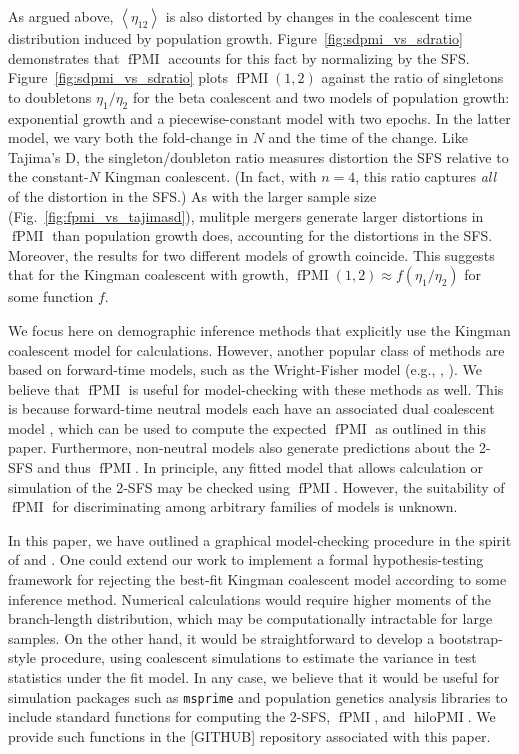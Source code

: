 \documentclass[11pt, letterpaper]{article}   	%
\newcommand{\fig}[1]{Fig.~\ref{#1}}
\newcommand{\Fig}[1]{Figure~\ref{#1}}
\newcommand{\E}[1]{\left< #1 \right>}
\DeclareMathOperator{\fpmi}{fPMI}
\DeclareMathOperator{\hilopmi}{hiloPMI}
\begin{document}
As argued above, $\E{\eta_{12}}$ is also distorted by changes in the coalescent time distribution induced by population growth.
\Fig{fig:sdpmi_vs_sdratio} demonstrates that $\fpmi$ accounts for this fact by normalizing by the SFS.
\Fig{fig:sdpmi_vs_sdratio} plots $\fpmi(1,2)$ against the ratio of singletons to doubletons $\eta_1 / \eta_2$ for the beta coalescent and two models of population growth: exponential growth and a piecewise-constant model with two epochs.
In the latter model, we vary both the fold-change in $N$ and the time of the change.
Like Tajima's D, the singleton/doubleton ratio measures distortion the SFS relative to the constant-$N$ Kingman coalescent.
(In fact, with $n=4$, this ratio captures \emph{all} of the distortion in the SFS.)
As with the larger sample size (\fig{fig:fpmi_vs_tajimasd}), mulitple mergers generate larger distortions in $\fpmi$ than population growth does, accounting for the distortions in the SFS.
Moreover, the results for two different models of growth coincide.
This suggests that for the Kingman coalescent with growth, $\fpmi(1,2) \approx f(\eta_1/\eta_2)$ for some function $f$.

We focus here on demographic inference methods that explicitly use the Kingman coalescent model for calculations.
However, another popular class of methods are based on forward-time models, such as the Wright-Fisher model (e.g., \cite{GutenkunstEtAl2009}, \cite{dical}).
We believe that $\fpmi$ is useful for model-checking with these methods as well.
This is because forward-time neutral models each have an associated dual coalescent model \cite{etheridge}, which can be used to compute the expected $\fpmi$ as outlined in this paper.
Furthermore, non-neutral models also generate predictions about the 2-SFS and thus $\fpmi$.
In principle, any fitted model that allows calculation or simulation of the 2-SFS may be checked using $\fpmi$.
However, the suitability of $\fpmi$ for discriminating among arbitrary families of models is unknown.

In this paper, we have outlined a graphical model-checking procedure in the spirit of \cite{Anscombe} and \cite{GelmanBDA}.
One could extend our work to implement a formal hypothesis-testing framework for rejecting the best-fit Kingman coalescent model according to some inference method.
Numerical calculations would require higher moments of the branch-length distribution, which may be computationally intractable for large samples.
On the other hand, it would be straightforward to develop a bootstrap-style procedure, using coalescent simulations to estimate the variance in test statistics under the fit model.
In any case, we believe that it would be useful for simulation packages such as \texttt{msprime} and population genetics analysis libraries to include standard functions for computing the 2-SFS, $\fpmi$, and $\hilopmi$.
We provide such functions in the [GITHUB] repository associated with this paper.
\end{document}
